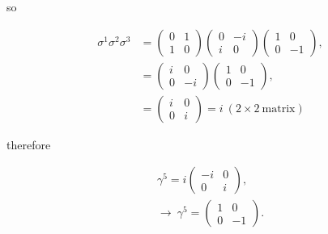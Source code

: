 so

\begin{align*}
    \sigma^1\sigma^2\sigma^3 &= \begin{pmatrix}0 & 1 \\ 1 & 0\end{pmatrix}\begin{pmatrix}0 & -i \\ i & 0\end{pmatrix}\begin{pmatrix}1 & 0 \\ 0 & -1\end{pmatrix}, \\
    &= \begin{pmatrix}i & 0 \\ 0 & -i\end{pmatrix}\begin{pmatrix}1 & 0 \\ 0 & -1\end{pmatrix}, \\
    &= \begin{pmatrix}i & 0 \\ 0 & i\end{pmatrix} = i \ (2\times2\ \mathrm{matrix})
\end{align*}

therefore

\begin{gather*}
    \gamma^5 = i\begin{pmatrix}-i & 0 \\ 0 & i\end{pmatrix}, \\
    \rightarrow \ \boxed{\gamma^5 = \begin{pmatrix}1 & 0 \\ 0 & -1\end{pmatrix}.}
\end{gather*}